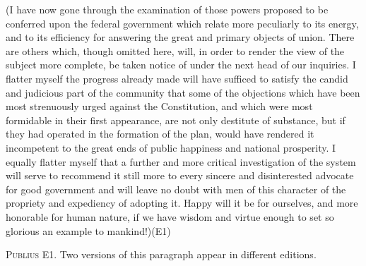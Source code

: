 (I have now gone through the examination of those powers proposed to be conferred upon the federal government which relate more peculiarly to its energy, and to its efficiency for answering the great and primary objects of union. There are others which, though omitted here, will, in order to render the view of the subject more complete, be taken notice of under the next head of our inquiries. I flatter myself the progress already made will have sufficed to satisfy the candid and judicious part of the community that some of the objections which have been most strenuously urged against the Constitution, and which were most formidable in their first appearance, are not only destitute of substance, but if they had operated in the formation of the plan, would have rendered it incompetent to the great ends of public happiness and national prosperity. I equally flatter myself that a further and more critical investigation of the system will serve to recommend it still more to every sincere and disinterested advocate for good government and will leave no doubt with men of this character of the propriety and expediency of adopting it. Happy will it be for ourselves, and more honorable for human nature, if we have wisdom and virtue enough to set so glorious an example to mankind!)(E1)

\vspace{.5cm}
\textsc{Publius}
E1. Two versions of this paragraph appear in different editions.

